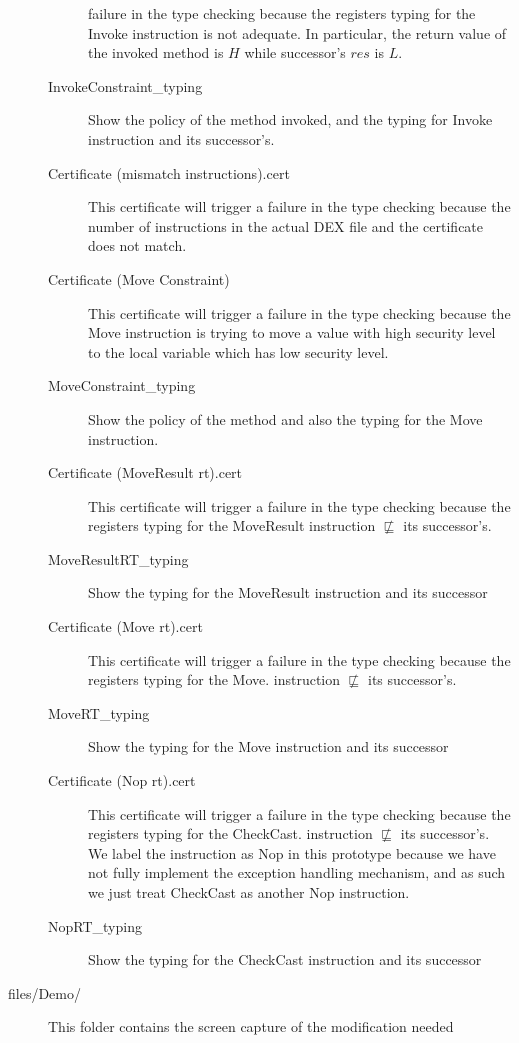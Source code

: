 \documentclass[a4]{article}
\begin{document}
\begin{description}
\begin{description}
        failure in the type checking because the registers typing for the Invoke 
        instruction is not adequate. In particular, the return value of the invoked
        method is $H$ while successor's $res$ is $L$.
      \item[InvokeConstraint\_typing] Show the policy of the method invoked, and the 
        typing for Invoke instruction and its successor's.
      \item[Certificate (mismatch instructions).cert] This certificate will trigger a
        failure in the type checking because the number of instructions in the actual
        DEX file and the certificate does not match.
      \item[Certificate (Move Constraint)] This certificate will trigger a failure in
        the type checking because the Move instruction is trying to move a value with
        high security level to the local variable which has low security level.
      \item[MoveConstraint\_typing] Show the policy of the method and also the typing
        for the Move instruction. 
      \item[Certificate (MoveResult rt).cert] This certificate will trigger a failure 
        in the type checking because the registers typing for the MoveResult 
        instruction $\nsqsubseteq$ its successor's.
      \item[MoveResultRT\_typing] Show the typing for the MoveResult instruction and 
        its successor
      \item[Certificate (Move rt).cert] This certificate will trigger a failure 
        in the type checking because the registers typing for the Move. 
        instruction $\nsqsubseteq$ its successor's.
      \item[MoveRT\_typing] Show the typing for the Move instruction and its successor
      \item[Certificate (Nop rt).cert] This certificate will trigger a failure 
        in the type checking because the registers typing for the CheckCast. 
        instruction $\nsqsubseteq$ its successor's. We label the instruction as Nop in
        this prototype because we have not fully implement the exception handling 
        mechanism, and as such we just treat CheckCast as another Nop instruction.
      \item[NopRT\_typing] Show the typing for the CheckCast instruction and 
        its successor
    \end{description}
  \item[files/Demo/] This folder contains the screen capture of the modification needed 

\end{description}
\end{document}

